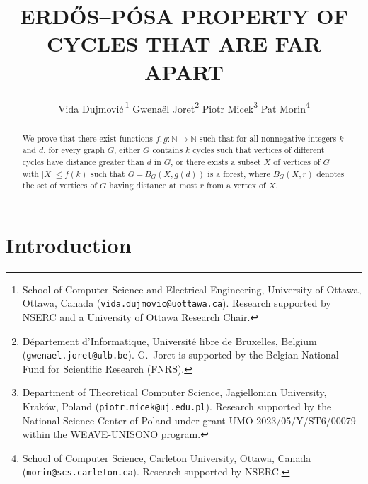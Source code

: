 \documentclass{patmorin}
\title{\MakeUppercase{{E}rdős–{P}ósa property of cycles that are far apart}}
\author{
 Vida Dujmovi{\'c}\,\thanks{School of Computer Science and Electrical Engineering, University of Ottawa, Ottawa, Canada (\texttt{vida.dujmovic@uottawa.ca}). Research supported by NSERC and a University of Ottawa Research Chair.}
 \qquad
 Gwena\"el Joret\thanks{D\'epartement d'Informatique, Universit\'e libre de Bruxelles, Belgium ({\tt gwenael.joret@ulb.be}). G.\ Joret is supported by the Belgian National Fund for Scientific Research (FNRS).}
 \qquad
 Piotr Micek\thanks{Department of Theoretical Computer Science, Jagiellonian University, Kraków, Poland (\texttt{piotr.micek@uj.edu.pl}). Research supported by the National Science Center of Poland under grant
UMO-2023/05/Y/ST6/00079 within the WEAVE-UNISONO program.}
 \qquad
 Pat Morin\thanks{School of Computer Science, Carleton University, Ottawa, Canada (\texttt{morin@scs.carleton.ca}). Research supported by NSERC.}}
\date{}
\newcommand{\pat}[1]{\textcolor{Blue}{[Pat: #1]}}
\begin{document}
\maketitle



\begin{abstract}
  We prove that there exist functions  $f,g:\mathbb{N}\to\mathbb{N}$ such that for all nonnegative integers $k$ and $d$,  for every graph $G$,  either $G$ contains $k$ cycles such that vertices of different cycles have distance greater than $d$ in $G$, or there exists a subset $X$ of vertices of $G$ with $|X|\leq f(k)$ such that  $G-B_G(X,g(d))$ is a forest, where $B_G(X,r)$ denotes the set of vertices of $G$ having distance at most $r$ from a vertex of $X$.
\end{abstract}



\section{Introduction}
\end{document}
